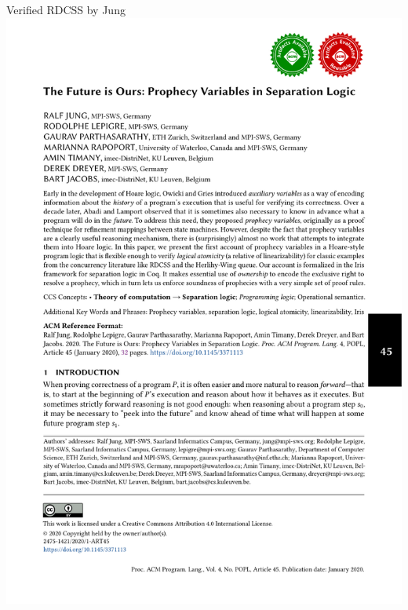 \begin{frame}{Verified RDCSS by Jung \etal}
\centering
\includegraphics[scale=0.5]{images/jung_lepigre_parthasarathy_2020.pdf}
\end{frame}

